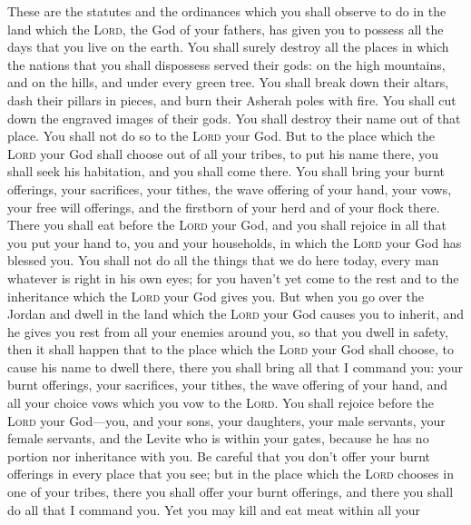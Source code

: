  These are the statutes and the ordinances which you shall
observe to do in the land which the \textsc{Lord}, the God of your
fathers, has given you to possess all the days that you live on the
earth.  You shall surely destroy all the places in which
the nations that you shall dispossess served their gods: on the high
mountains, and on the hills, and under every green tree. 
You shall break down their altars, dash their pillars in pieces, and
burn their Asherah poles with fire. You shall cut down the engraved
images of their gods. You shall destroy their name out of that place.
 You shall not do so to the \textsc{Lord} your God.
 But to the place which the \textsc{Lord} your God shall
choose out of all your tribes, to put his name there, you shall seek his
habitation, and you shall come there.  You shall bring
your burnt offerings, your sacrifices, your tithes, the wave offering of
your hand, your vows, your free will offerings, and the firstborn of
your herd and of your flock there.  There you shall eat
before the \textsc{Lord} your God, and you shall rejoice in all that you
put your hand to, you and your households, in which the \textsc{Lord}
your God has blessed you.  You shall not do all the things
that we do here today, every man whatever is right in his own eyes;
 for you haven't yet come to the rest and to the
inheritance which the \textsc{Lord} your God gives you. 
But when you go over the Jordan and dwell in the land which the
\textsc{Lord} your God causes you to inherit, and he gives you rest from
all your enemies around you, so that you dwell in safety,
 then it shall happen that to the place which the
\textsc{Lord} your God shall choose, to cause his name to dwell there,
there you shall bring all that I command you: your burnt offerings, your
sacrifices, your tithes, the wave offering of your hand, and all your
choice vows which you vow to the \textsc{Lord}.  You
shall rejoice before the \textsc{Lord} your God---you, and your sons,
your daughters, your male servants, your female servants, and the Levite
who is within your gates, because he has no portion nor inheritance with
you.  Be careful that you don't offer your burnt
offerings in every place that you see;  but in the place
which the \textsc{Lord} chooses in one of your tribes, there you shall
offer your burnt offerings, and there you shall do all that I command
you.  Yet you may kill and eat meat within all your
